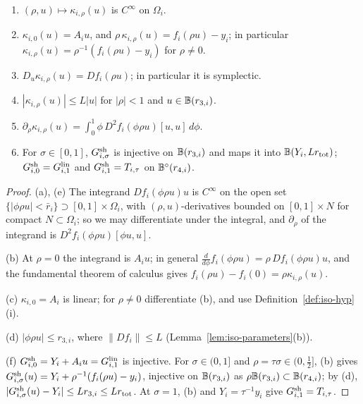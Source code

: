 \begin{lemma}\label{lem:iso-shape}
\begin{enumerate}[label=(\alph*)]
\item $(\rho,u)\mapsto\kappa_{i,\rho}(u)$ is $C^\infty$ on $\Omega_i$.
\item $\kappa_{i,0}(u)=A_iu$, and $\rho\,\kappa_{i,\rho}(u)=f_i(\rho u)-y_i$; in particular
 $\kappa_{i,\rho}(u)=\rho^{-1}(f_i(\rho u)-y_i)$ for $\rho\ne0$.
\item $D_u\kappa_{i,\rho}(u)=Df_i(\rho u)$; in particular it is symplectic.
\item $|\kappa_{i,\rho}(u)|\le L|u|$ for $|\rho|<1$ and $u\in\mathbb{B}(r_{3,i})$.
\item $\partial_\rho\kappa_{i,\rho}(u)=\int_0^1\phi\,D^2f_i(\phi\rho u)[u,u]\,d\phi$.
\item For $\sigma\in[0,1]$, $G^{\rm sh}_{i,\sigma}$ is injective on $\mathbb{B}(r_{3,i})$ and maps it into $\mathbb{B}(Y_i,Lr_{\rm tot})$;
 $G^{\rm sh}_{i,0}=G^{\rm lin}_{i,1}$ and $G^{\rm sh}_{i,1}=T_{i,\tau}$ on $\mathbb{B}^\circ(r_{4,i})$.
\end{enumerate}
\end{lemma}

\begin{proof}
(a), (e) The integrand $Df_i(\phi\rho u)u$ is $C^\infty$ on the open set $\{|\phi\rho u|<\bar r_i\}\supset[0,1]\times\Omega_i$, with $(\rho,u)$-derivatives bounded on $[0,1]\times N$ for compact $N\subset\Omega_i$; so we may differentiate under the integral, and $\partial_\rho$ of the integrand is $D^2f_i(\phi\rho u)[\phi u,u]$.

(b) At $\rho=0$ the integrand is $A_iu$; in general $\frac{d}{d\phi}f_i(\phi\rho u)=\rho\,Df_i(\phi\rho u)u$, and the fundamental theorem of calculus gives $f_i(\rho u)-f_i(0)=\rho\kappa_{i,\rho}(u)$.

(c) $\kappa_{i,0}=A_i$ is linear; for $\rho\ne0$ differentiate (b), and use Definition~\ref{def:iso-hyp}(i).

(d) $|\phi\rho u|\le r_{3,i}$, where $\|Df_i\|\le L$ (Lemma~\ref{lem:iso-parameters}(b)).

(f) $G^{\rm sh}_{i,0}=Y_i+A_iu=G^{\rm lin}_{i,1}$ is injective. For $\sigma\in(0,1]$ and $\rho=\tau\sigma\in(0,\frac12]$, (b) gives $G^{\rm sh}_{i,\sigma}(u)=Y_i+\rho^{-1}(f_i(\rho u)-y_i)$, injective on $\mathbb{B}(r_{3,i})$ as $\rho\mathbb{B}(r_{3,i})\subset\mathbb{B}(r_{4,i})$; by (d), $|G^{\rm sh}_{i,\sigma}(u)-Y_i|\le Lr_{3,i}\le Lr_{\rm tot}$. At $\sigma=1$, (b) and $Y_i=\tau^{-1}y_i$ give $G^{\rm sh}_{i,1}=T_{i,\tau}$.
\end{proof}

